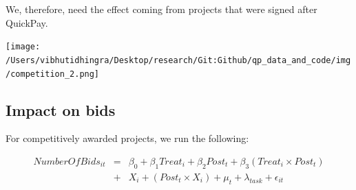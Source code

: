 \documentclass[
]{article}
\begin{document}
We, therefore, need the effect coming from projects that were signed
after QuickPay.

\texttt{[image: /Users/vibhutidhingra/Desktop/research/Git:Github/qp\_data\_and\_code/img/competition\_2.png]}

\hypertarget{impact-on-bids}{%
\subsection{Impact on bids}\label{impact-on-bids}}

For competitively awarded projects, we run the following:

\[ \begin{aligned}
NumberOfBids_{it} &=& \beta_0 + \beta_1 Treat_i + \beta_2 Post_t + \beta_3 (Treat_i \times Post_t) \\
&+&X_i + (Post_t \times X_i) + \mu_t + \lambda_{task}+ \epsilon_{it}
\end{aligned}\]
\end{document}
